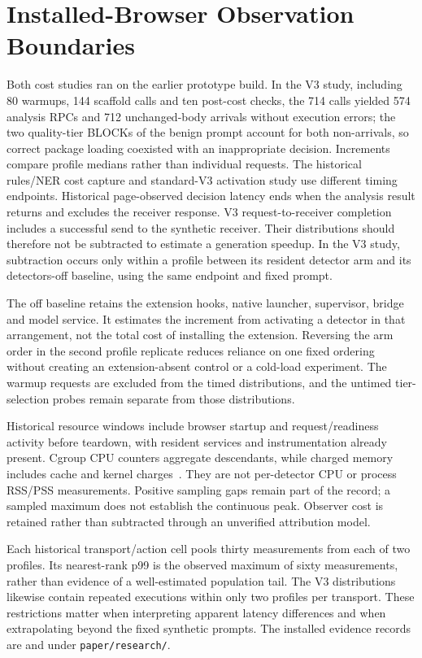 \documentclass[sigconf]{acmart}
\theoremstyle{acmdefinition}\newtheorem{property}{Property}
\begin{document}
\section{Installed-Browser Observation Boundaries}
\label{app:browser}
Both cost studies ran on the earlier prototype build. In the V3 study, including 80 warmups, 144 scaffold calls and ten post-cost checks, the 714 calls yielded 574 analysis RPCs and 712 unchanged-body arrivals without execution errors; the two quality-tier BLOCKs of the benign prompt account for both non-arrivals, so correct package loading coexisted with an inappropriate decision. Increments compare profile medians rather than individual requests. The historical rules/NER cost capture and standard-V3 activation study use different timing endpoints. Historical page-observed decision latency ends when the analysis result returns and excludes the receiver response. V3 request-to-receiver completion includes a successful send to the synthetic receiver. Their distributions should therefore not be subtracted to estimate a generation speedup. In the V3 study, subtraction occurs only within a profile between its resident detector arm and its detectors-off baseline, using the same endpoint and fixed prompt.

The off baseline retains the extension hooks, native launcher, supervisor, bridge and model service. It estimates the increment from activating a detector in that arrangement, not the total cost of installing the extension. Reversing the arm order in the second profile replicate reduces reliance on one fixed ordering without creating an extension-absent control or a cold-load experiment. The warmup requests are excluded from the timed distributions, and the untimed tier-selection probes remain separate from those distributions.

Historical resource windows include browser startup and request/readiness activity before teardown, with resident services and instrumentation already present. Cgroup CPU counters aggregate descendants, while charged memory includes cache and kernel charges~\cite{LinuxCgroupV2Interfaces2026}. They are not per-detector CPU or process RSS/PSS measurements. Positive sampling gaps remain part of the record; a sampled maximum does not establish the continuous peak. Observer cost is retained rather than subtracted through an unverified attribution model.

Each historical transport/action cell pools thirty measurements from each of two profiles. Its nearest-rank p99 is the observed maximum of sixty measurements, rather than evidence of a well-estimated population tail. The V3 distributions likewise contain repeated executions within only two profiles per transport. These restrictions matter when interpreting apparent latency differences and when extrapolating beyond the fixed synthetic prompts. The installed evidence records are  and  under \texttt{paper/research/}.
\end{document}
